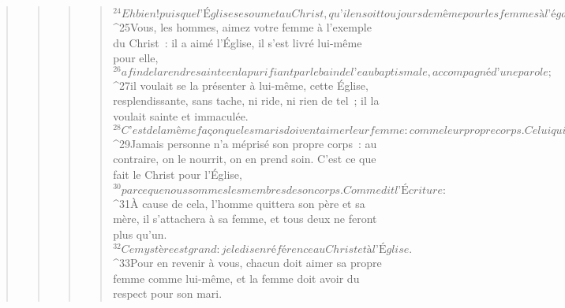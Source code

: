 \begin{verse}
\begin{verse}
\begin{verse}
\begin{verse}
${}^{24}Eh bien ! puisque l’Église se soumet au Christ, qu’il en soit toujours de même pour les femmes à l’égard de leur mari.
${}^{25}Vous, les hommes, aimez votre femme à l’exemple du Christ : il a aimé l’Église, il s’est livré lui-même pour elle, 
${}^{26}afin de la rendre sainte en la purifiant par le bain de l’eau baptismale, accompagné d’une parole ; 
${}^{27}il voulait se la présenter à lui-même, cette Église, resplendissante, sans tache, ni ride, ni rien de tel ; il la voulait sainte et immaculée. 
${}^{28}C’est de la même façon que les maris doivent aimer leur femme : comme leur propre corps. Celui qui aime sa femme s’aime soi-même. 
${}^{29}Jamais personne n’a méprisé son propre corps : au contraire, on le nourrit, on en prend soin. C’est ce que fait le Christ pour l’Église, 
${}^{30}parce que nous sommes les membres de son corps. Comme dit l’Écriture : 
${}^{31}À cause de cela, l’homme quittera son père et sa mère, il s’attachera à sa femme, et tous deux ne feront plus qu’un. 
${}^{32}Ce mystère est grand : je le dis en référence au Christ et à l’Église. 
${}^{33}Pour en revenir à vous, chacun doit aimer sa propre femme comme lui-même, et la femme doit avoir du respect pour son mari.
      

\end{verse}
\end{verse}
\end{verse}
\end{verse}
